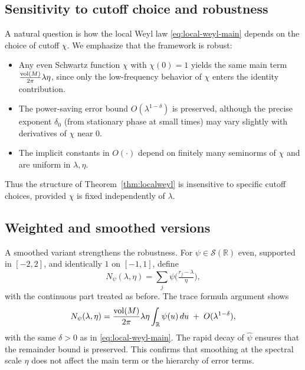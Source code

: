 
\subsection{Sensitivity to cutoff choice and robustness}

A natural question is how the local Weyl law \eqref{eq:local-weyl-main} depends on the choice of cutoff $\chi$.  
We emphasize that the framework is robust:

\begin{itemize}
  \item Any even Schwartz function $\chi$ with $\chi(0)=1$ yields the same main term 
  $\tfrac{\operatorname{vol}(M)}{2\pi}\lambda\eta$, since only the low-frequency behavior of $\chi$ enters the identity contribution.
  \item The power-saving error bound $O(\lambda^{1-\delta})$ is preserved, although the precise exponent $\delta_0$ (from stationary phase at small times) may vary slightly with derivatives of $\chi$ near $0$. 
  \item The implicit constants in $O(\cdot)$ depend on finitely many seminorms of $\chi$ and are uniform in $\lambda,\eta$.
\end{itemize}

Thus the structure of Theorem~\ref{thm:localweyl} is insensitive to specific cutoff choices, provided $\chi$ is fixed independently of $\lambda$.

\subsection{Weighted and smoothed versions}

A smoothed variant strengthens the robustness. For $\psi\in\mathcal{S}(\mathbb{R})$ even, supported in $[-2,2]$, and identically $1$ on $[-1,1]$, define
\[
N_\psi(\lambda,\eta)=\sum_j \psi\!\Big(\tfrac{r_j-\lambda}{\eta}\Big),
\]
with the continuous part treated as before. The trace formula argument shows
\[
N_\psi(\lambda,\eta) = \frac{\operatorname{vol}(M)}{2\pi}\lambda\eta \int_{\mathbb{R}}\psi(u)\,du \;+\; O(\lambda^{1-\delta}),
\]
with the same $\delta>0$ as in \eqref{eq:local-weyl-main}.  
The rapid decay of $\widehat{\psi}$ ensures that the remainder bound is preserved.  
This confirms that smoothing at the spectral scale $\eta$ does not affect the main term or the hierarchy of error terms.

